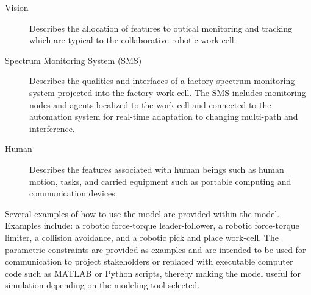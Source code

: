 \begin{description}
\item[Vision] Describes the allocation of features to optical monitoring and tracking which are typical to the collaborative robotic work-cell.

\item[Spectrum Monitoring System (SMS)] Describes the qualities and interfaces of a factory spectrum monitoring system projected into the factory work-cell.  The SMS includes monitoring nodes and agents localized to the work-cell and connected to the automation system for real-time adaptation to changing multi-path and interference. 

\item[Human] Describes the features associated with human beings such as human motion, tasks, and carried equipment such as portable computing and communication devices.
\vspace{3mm} 

\end{description}

Several examples of how to use the model are provided within the model\cite{SysML.Candell2018}.  Examples include: a robotic force-torque leader-follower, a robotic force-torque limiter, a collision avoidance, and a robotic pick and place work-cell.  The parametric constraints are provided as examples and are intended to be used for communication to project stakeholders or replaced with executable computer code such as MATLAB or Python scripts, thereby making the model useful for simulation depending on the modeling tool selected.


